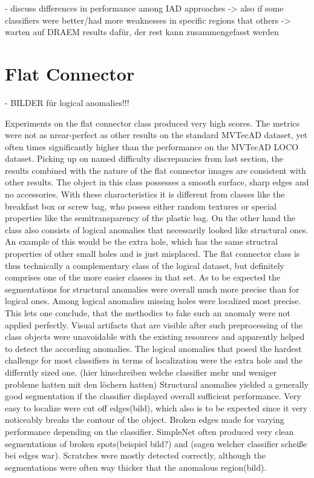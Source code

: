 - discuss differences in performance among IAD approaches\newline
-> also if some classifiers were better/had more weaknesses in specific regions that others\newline
-> warten auf DRAEM results dafür, der rest kann zusammengefasst werden


\section{Flat Connector}
\label{sec:flatconnectordiscussion}

- BILDER für logical anomalies!!!

Experiments on the flat connector class produced very high scores. The metrics were not as nrear-perfect as other results on the standard 
MVTecAD \cite{MVTEC_Bergmann_2021} dataset, yet often times significantly higher than the performance on the MVTecAD LOCO \cite{LOCODentsAndScratchesBergmann2022} 
dataset. Picking up on named difficulty discrepancies from last section, the results combined with the nature of the flat connector images 
are consistent with other results. The object in this class possesses a smooth surface, sharp edges and no accessories. With these 
characteristics it is different from classes like the breakfast box or screw bag, who posess either random textures or special properties 
like the semitransparency of the plastic bag. On the other hand the class also consists of logical anomalies that necessarily looked 
like structural ones. An example of this would be the extra hole, which has the same structral properties of other small holes and is 
just misplaced. The flat connector class is thus technically a complementary class of the logical dataset, but definitely comprises 
one of the more easier classes in that set. \newline
As to be expected the segmentations for structural anomalies were overall much more precise than for logical ones. Among logical anomalies 
missing holes were localized most precise. This lets one conclude, that the methodics to fake such an anomaly were not applied perfectly. 
Visual artifacts that are visible after such preprocessing of the class objects were unavoidable with the existing resources and apparently 
helped to detect the according anomalies. The logical anomalies that posed the hardest challenge for most classifiers in terms of localization 
were the extra hole and the differntly sized one. (hier hinschreiben welche classifier mehr und weniger probleme hatten mit den löchern hatten)
Structural anomalies yielded a generally good segmentation if the classifier displayed overall sufficient performance. Very easy to localize 
were cut off edges(bild), which also is to be expected since it very noticeably breaks the contour of the object. Broken edges made for 
varying performance depending on the classifier. SimpleNet often produced very clean segmentations of broken spots(beispiel bild?) and 
(sagen welcher classifier scheiße bei edges war). Scratches were mostly detected correctly, although the segmentations were often 
way thicker that the anomalous region(bild).



